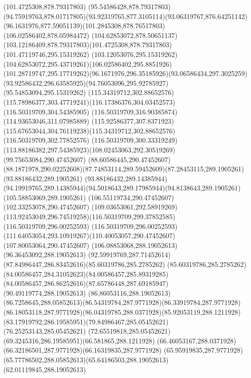 {{\moveto(101.4725308,878.79317803)
\lineto(95.54586428,878.79317803)
\curveto(94.75919763,878.01717805)(93.92319765,877.3105114)(93.06319767,876.64251142)
\curveto(96.1631976,877.59051139)(101.2845308,878.76517803)(106.02586402,878.05984472)
\curveto(104.62853072,878.50651137)(103.12186409,878.79317803)(101.4725308,878.79317803)
\moveto(101.47119746,295.15319262)
\curveto(103.12053076,295.15319262)(104.62853072,295.43719261)(106.02586402,295.8851926)
\curveto(101.28719747,295.17719262)(96.1671976,296.35185926)(93.06586434,297.3025259)
\curveto(93.92586432,296.63585925)(94.76053096,295.92785927)(95.54853094,295.15319262)
\closepath
\moveto(115.34319712,302.88652576)
\curveto(115.78986377,303.47719241)(116.17386376,304.03452573)(116.50319709,304.54385905)
\lineto(116.50319709,316.90385874)
\lineto(114.93653046,311.07985889)
\curveto(115.92586377,307.8371923)(115.67653044,304.76119238)(115.34319712,302.88652576)
\moveto(116.50319709,302.77852576)
\lineto(116.50319709,300.33319249)
\curveto(113.88186382,297.54385923)(108.02453063,292.30519269)(99.75653084,290.47452607)
\lineto(88.60586445,290.47452607)
\curveto(88.1871978,290.02252608)(87.74853114,289.59452609)(87.28453115,289.1905261)
\lineto(93.88186432,289.1905261)
\lineto(93.88186432,289.14385944)
\curveto(94.19919765,289.14385944)(94.5018643,289.17985944)(94.8138643,289.1905261)
\lineto(105.58853069,289.1905261)
\lineto(106.55119734,290.47452607)
\lineto(102.33253078,290.47452607)
\curveto(109.03653061,292.58919269)(113.92453049,296.74519258)(116.50319709,299.37852585)
\lineto(116.50319709,296.00252593)
\curveto(116.50319709,296.00252593)(111.64053054,293.10919267)(110.40053057,290.47452607)
\lineto(107.80053064,290.47452607)
\lineto(106.08853068,288.19052613)
\lineto(96.36453092,288.19052613)
\curveto(92.59919769,287.71452614)(87.84986447,286.83452616)(85.60319786,285.2785262)
\curveto(85.60319786,285.2785262)(84.00586457,284.31052623)(84.00586457,285.89319285)
\curveto(84.00586457,286.86252616)(87.65786448,287.69185947)(90.49119774,288.19052613)
\lineto(86.86053116,288.19052613)
\curveto(86.7258645,288.05852613)(86.54319784,287.9771928)(86.33919784,287.9771928)
\curveto(86.18053118,287.9771928)(86.04319785,288.0371928)(85.92053119,288.1211928)
\curveto(83.17919792,286.19585951)(79.84986467,285.05452621)(76.25253143,285.05452621)
\curveto(72.65519818,285.05452621)(69.3245316,286.19585951)(66.581865,288.1211928)
\curveto(66.46053167,288.0371928)(66.32186501,287.9771928)(66.16319835,287.9771928)
\curveto(65.95919835,287.9771928)(65.77786502,288.05852613)(65.64186503,288.19052613)
\lineto(62.01119845,288.19052613)
}}
